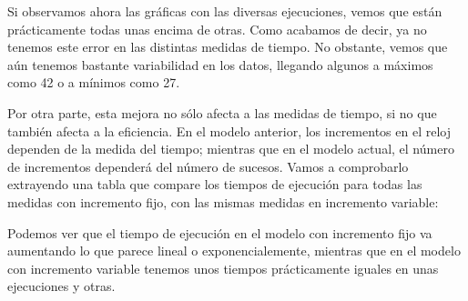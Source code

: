 \documentclass[11pt,a4paper]{report}
\begin{document}
Si observamos ahora las gráficas con las diversas ejecuciones, vemos que están prácticamente todas unas encima de otras. Como acabamos de decir, ya no tenemos este
error en las distintas medidas de tiempo. No obstante, vemos que aún tenemos bastante variabilidad en los datos, llegando algunos a máximos como 42 o a mínimos
como 27.

Por otra parte, esta mejora no sólo afecta a las medidas de tiempo, si no que también afecta a la eficiencia. En el modelo anterior, los incrementos en el reloj
dependen de la medida del tiempo; mientras que en el modelo actual, el número de incrementos dependerá del número de sucesos. Vamos a comprobarlo extrayendo una
tabla que compare los tiempos de ejecución para todas las medidas con incremento fijo, con las mismas medidas en incremento variable:
\begin{table}[H]
\end{table}

Podemos ver que el tiempo de ejecución en el modelo con incremento fijo va aumentando lo que parece lineal o exponencialemente, mientras que en el modelo con
incremento variable tenemos unos tiempos prácticamente iguales en unas ejecuciones y otras.
\end{document}
